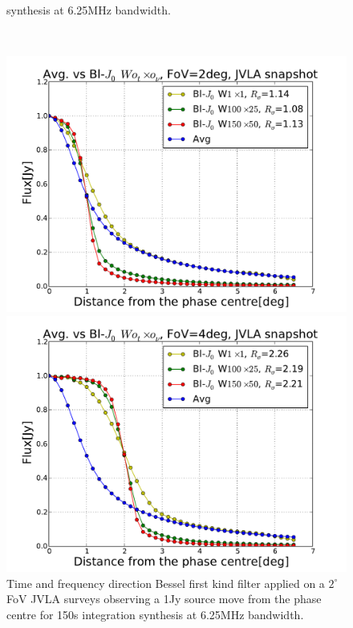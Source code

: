 \documentclass[useAMS,usenatbib]{mn2e}
\begin{document}
\begin{figure}
\begin{minipage}{0.36\linewidth}
{synthesis at 6.25MHz bandwidth.}\label{fig:Bl-sinc-FoV4} 
\end{minipage}\\
\begin{minipage}{0.36\linewidth}\includegraphics[width=1\textwidth]{./Figures/Bl-bessel-FoV2-vla.pdf}\caption{Time and frequency 
direction Bessel first kind filter applied on a $2^{\circ}$ FoV JVLA surveys observing a 1Jy source move from the phase centre for 150s 
integration synthesis at 6.25MHz bandwidth.}\label{fig:Bl-bessel-FoV2}\end{minipage}
\hspace{1cm}
\begin{minipage}{0.36\linewidth}\includegraphics[width=1\textwidth]{./Figures/Bl-bessel-FoV4-vla.pdf}\caption{Time and frequency 
direction Bessel first kind filter applied on a $2^{\circ}$ FoV JVLA surveys observing a 1Jy source move from the phase centre for 150s 
integration synthesis at 6.25MHz bandwidth.}\label{fig:Bl-bessel-FoV4}\end{minipage}
\end{figure}
\end{document}
